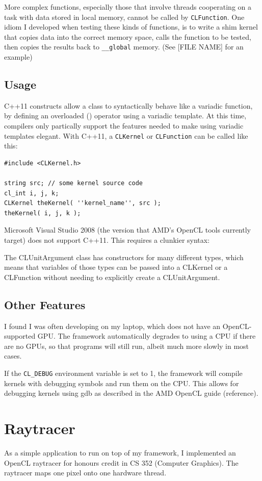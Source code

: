 \documentclass{article}
\begin{document}
More complex functions, especially those that involve threads cooperating on a task with data stored in local memory, cannot be called by \texttt{CLFunction}. One idiom I developed when testing these kinds of functions, is to write a shim kernel that copies data into the correct memory space, calls the function to be tested, then copies the results back to \texttt{\_\_global} memory. (See [FILE NAME] for an example)

\subsection{Usage}
C++11 constructs allow a class to syntactically behave like a variadic function, by defining an overloaded () operator using a variadic template. At this time, compilers only partically support the features needed to make using variadic templates elegant. With C++11, a \texttt{CLKernel} or \texttt{CLFunction} can be called like this:

\begin{lstlisting}
#include <CLKernel.h>

string src; // some kernel source code
cl_int i, j, k;
CLKernel theKernel( ''kernel_name'', src );
theKernel( i, j, k );
\end{lstlisting}

Microsoft Visual Studio 2008 (the version that AMD's OpenCL tools currently target) does not support C++11. This requires a clunkier syntax:

The CLUnitArgument class has constructors for many different types, which means that variables of those types can be passed into a CLKernel or a CLFunction without needing to explicitly create a CLUnitArgument.

\subsection{Other Features}
I found I was often developing on my laptop, which does not have an OpenCL-supported GPU. The framework automatically degrades to using a CPU if there are no GPUs, so that programs will still run, albeit much more slowly in most cases.

If the \texttt{CL\_DEBUG} environment variable is set to 1, the framework will compile kernels with debugging symbols and run them on the CPU. This allows for debugging kernels using gdb as described in the AMD OpenCL guide (reference).

\section{Raytracer}
As a simple application to run on top of my framework, I implemented an OpenCL raytracer for honours credit in CS 352 (Computer Graphics). The raytracer maps one pixel onto one hardware thread.
\end{document}
